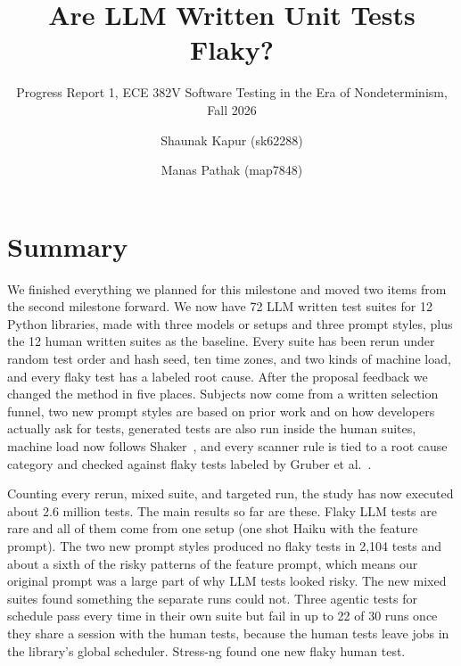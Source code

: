 \documentclass[sigconf,nonacm]{acmart}
\begin{document}
\sloppy

\title{Are LLM Written Unit Tests Flaky?}
\subtitle{Progress Report 1, ECE 382V Software Testing in the Era of Nondeterminism, Fall 2026}

\author{Shaunak Kapur (sk62288)}
\author{Manas Pathak (map7848)}

\maketitle

\section{Summary}
We finished everything we planned for this milestone and moved two items from the second milestone forward. We now have 72 LLM written test suites for 12 Python libraries, made with three models or setups and three prompt styles, plus the 12 human written suites as the baseline. Every suite has been rerun under random test order and hash seed, ten time zones, and two kinds of machine load, and every flaky test has a labeled root cause. After the proposal feedback we changed the method in five places. Subjects now come from a written selection funnel, two new prompt styles are based on prior work and on how developers actually ask for tests, generated tests are also run inside the human suites, machine load now follows Shaker~\cite{silva2020}, and every scanner rule is tied to a root cause category and checked against flaky tests labeled by Gruber et al.~\cite{gruber2021}.

Counting every rerun, mixed suite, and targeted run, the study has now executed about 2.6 million tests. The main results so far are these. Flaky LLM tests are rare and all of them come from one setup (one shot Haiku with the feature prompt). The two new prompt styles produced no flaky tests in 2,104 tests and about a sixth of the risky patterns of the feature prompt, which means our original prompt was a large part of why LLM tests looked risky. The new mixed suites found something the separate runs could not. Three agentic tests for schedule pass every time in their own suite but fail in up to 22 of 30 runs once they share a session with the human tests, because the human tests leave jobs in the library's global scheduler. Stress-ng found one new flaky human test.
\end{document}
